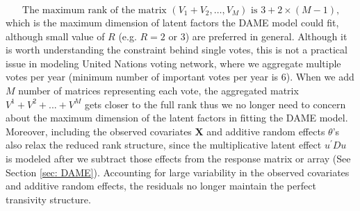 \documentclass[a4paper]{article}
\begin{document}
\begin{equation*}
\mbox{The maximum rank of the matrix $(V_1+V_2,\ldots,V_M)$ is $3 + 2\times (M-1)$,}
\end{equation*}
which is the maximum dimension of latent factors the DAME model could fit, although small value of $R$ (e.g. $R=2$ or $3$) are preferred in general. \fi 
Although it is worth understanding the constraint behind single votes, this is not a practical issue in modeling United Nations voting network, where we aggregate multiple votes per year (minimum number of important votes per year is 6). When we add $M$ number of matrices representing each vote, the aggregated matrix $V^1+V^2+...+V^M$ gets closer to the full rank thus we no longer need to concern about the maximum dimension of the latent factors in fitting the DAME model. Moreover, including the observed covariates $\mathbf{X}$ and additive random effects $\theta$'s also relax the reduced rank structure, since the multiplicative latent effect $u^\prime Du$ is modeled after we subtract those effects from the response matrix or array (See Section \ref{sec: DAME}). Accounting for large variability in the observed covariates and additive random effects, the residuals no longer maintain the perfect transivity structure.
\end{document}
